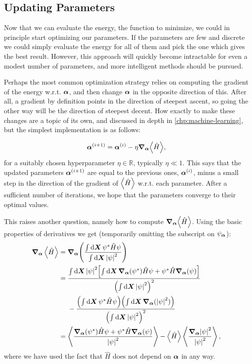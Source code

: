 \documentclass[Thesis.tex]{subfiles}
\begin{document}
\subsection{Updating Parameters}

Now that we can evaluate the energy, the function to minimize, we could in
principle start optimizing our parameters. If the parameters are few and
discrete we could simply evaluate the energy for all of them and pick the one
which gives the best result. However, this approach will quickly become
intractable for even a modest number of parameters, and more intelligent
methods should be pursued.

Perhaps the most common optimization strategy relies on computing the gradient
of the energy w.r.t. $\bm{\alpha}$, and then change $\bm{\alpha}$ in the opposite
direction of this. After all, a gradient by definition points in the direction
of steepest ascent, so going the other way will be the direction of steepest
decent. How exactly to make these changes are a topic of its own, and discussed in depth in \cref{chp:machine-learning}, but the simplest implementation is as follows:

\begin{align}
    \bm{\alpha}^{(i+1)} = \bm{\alpha}^{(i)} - \eta \grad_{\bm{\alpha}}{\expval{\hat H}},
\end{align}
for a suitably chosen hyperparameter $\eta\in\mathbb{R}$, typically $\eta\ll 1$.
This says that the updated parameters $\bm{\alpha}^{(i+1)}$ are equal to the
previous ones, $\bm{\alpha}^{(i)}$, minus a small step in the direction of the
gradient of $\expval{\hat H}$ w.r.t. each parameter. After a sufficient number
of iterations, we hope that the parameters converge to their optimal values.

This raises another question, namely how to compute
$\grad_{\bm{\alpha}}{\expval{\hat H}}$. Using the basic properties of derivatives we get (temporarily omitting the subscript on $\psi_{\bm{\alpha}}$):
\begin{align}
    \grad_{\bm{\alpha}}\expval{\hat H} &= \grad_{\bm{\alpha}}\qty( \frac{\int\dd{\bm{X}}\psi^*\hat H\psi}{\int\dd{\bm{X}}\abs{\psi}^2})\\
    &= \frac{\int\dd{\bm{X}} \abs{\psi}^2 \qty[ \int\dd{\bm{X}}
    \grad_{\bm{\alpha}}(\psi^*)\hat H\psi +
    \psi^*\hat H\grad_{\bm{\alpha}}(\psi)
    ]}{\qty(\int\dd{\bm{X}}\abs{\psi}^2)^2}\\
    &\quad{ }\ -
    \frac{\qty(\int\dd{\bm{X}}\psi^*\hat
    H\psi)\qty(\int\dd{\bm{X}}\grad_{\bm{\alpha}}(\abs{\psi}^2))}{\qty(\int\dd{\bm{X}}\abs{\psi}^2)^2} \\
    &= \expval{\frac{\grad_{\bm{\alpha}}(\psi^*)\hat H\psi + \psi^*\hat H\grad_{\bm{\alpha}}(\psi)}{\abs{\psi}^2}}
    - \expval{\hat H}\expval{\frac{\grad_{\bm{\alpha}}\abs{\psi}^2}{\abs{\psi}^2}},
\end{align}
where we have used the fact that $\hat H$ does not depend on $\bm{\alpha}$ in any way.
\end{document}
